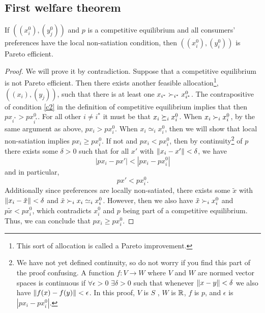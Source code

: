 \subsection{First welfare theorem}
\begin{theorem}
  If $((x_i^0),(y^0_j))$ and $p$ is a competitive equilibrium and all
  consumers' preferences have the local non-satiation condition, then
  $((x^0_i),(y^0_i))$ is Pareto efficient.
\end{theorem}
\begin{proof}
  We will prove it by contradiction. Suppose that a competitive
  equilibrium is not Pareto efficient. Then there exists another
  feasible allocation\footnote{This sort of allocation is called a
    Pareto improvement.}, $((x_i),(y_j))$, such that there is at least
  one $x_{i^*} \succ_{i^*} x_{i^*}^0$. The contrapositive of condition
  \ref{c2} in the definition of competitive equilibrium implies that
  then $p x_{i^*} > p x_{i^*}^0$.  For all other $i \neq i^*$ it must
  be that $x_i \succeq_i x_i^0$. When $x_i \succ_i x_i^0$, by the same
  argument as above, $p x_i > p x_i^0$. When $x_i \simeq_i x_i^0$,
  then we will show that local non-satiation implies $px_i \geq
  px_i^0$. If not and $px_i < p x_i^0$, then by continuity\footnote{We
    have not yet defined continuity, so do not worry if you find this
    part of the proof confusing. A function $f: V\rightarrow W$ where
    $V$ and $W$ are normed vector spaces is continuous if $\forall
    \epsilon > 0$ $\exists \delta > 0$ such that whenever $\left\Vert {x -
      y} \right\Vert<\delta$ we also have $\left\Vert {f(x) - f(y)} \right\Vert < \epsilon$. In this
    proof, $V$ is $S$ , $W$ is $\mathbb{R}$, $f$ is $p$, and $\epsilon$ is
    $|px_i - px_i^0|$. } of $p$ there exists some $\delta > 0$ such
  that for all $x'$ with $\left\Vert {x_i - x'} \right\Vert < \delta$, we have
  \[ | p x_i - p x' | < | px_i - p x_i^0| \]
  and in particular, 
  \[ p x' < px_i^0. \]
  Additionally since preferences are locally non-satiated, there
  exists some $\tilde{x}$ with $\left\Vert {x_i - \tilde{x}} \right\Vert<\delta$ and
  $\tilde{x} \succ_i x_i \simeq_i x_i^0$. However, then we also have
  $\tilde{x} \succ_i x_i^0$ and $p \tilde{x} < p x_i^0$, which contradicts
  $x_i^0$  and $p$ being part of a competitive equilibrium. Thus, we
  can conclude that $p x_i \geq p x_i^0$.


\end{proof}
